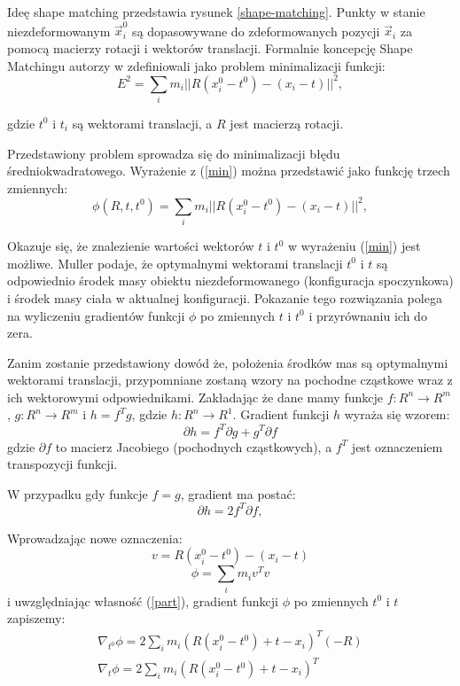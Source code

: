 Ideę shape matching przedstawia rysunek \ref{shape-matching}. Punkty w stanie
niezdeformowanym $\vec{x}^0_i$ są dopasowywane do zdeformowanych pozycji
$\vec{x}_i$ za
pomocą macierzy rotacji i wektorów translacji. 
Formalnie koncepcję Shape Matchingu autorzy w \cite{shape} zdefiniowali jako problem minimalizacji
funkcji:
\begin{equation}
E^2 = \sum_{i} m_i ||R (x^0_i - t^0) - (x_i - t) ||^2,
\label{min}
\end{equation}

gdzie $t^0$ i $t_i$ są wektorami translacji, a $R$ jest macierzą
rotacji.

Przedstawiony problem sprowadza się do minimalizacji błędu średniokwadratowego.
Wyrażenie z (\ref{min}) można przedstawić jako funkcję trzech zmiennych:
\begin{equation*}
\phi(R, t, t^0) = \sum_{i} m_i ||R (x^0_i - t^0) - (x_i - t) ||^2,
\end{equation*}

Okazuje się, że znalezienie wartości wektorów $t$ i $t^0$ w
wyrażeniu (\ref{min}) jest możliwe. Muller \cite{shape} podaje, że optymalnymi
wektorami translacji $t^0$ i $t$ są odpowiednio środek masy obiektu
niezdeformowanego (konfiguracja spoczynkowa) i środek masy
ciała w aktualnej konfiguracji. Pokazanie tego rozwiązania polega na
wyliczeniu gradientów funkcji $\phi$ po zmiennych $t$ i $t^0$ i przyrównaniu ich
do zera.

Zanim zostanie przedstawiony dowód że, położenia środków mas są optymalnymi wektorami
translacji, przypomniane zostaną wzory na pochodne cząstkowe wraz z ich
wektorowymi odpowiednikami. Zakładając że dane mamy funkcje $f: R^n \to R^m$,
$g: R^n \to R^m$ i $h = f^T g$, gdzie $h: R^n \to R^1$. Gradient
funkcji $h$ wyraża się wzorem:
\begin{equation*}
\partial h = f^T \partial g + g^T \partial f
\end{equation*}
gdzie $\partial f$ to macierz Jacobiego (pochodnych cząstkowych), a $f^T$ jest
oznaczeniem transpozycji funkcji.

W przypadku gdy funkcje $f = g$, gradient ma postać:
\begin{equation}
\partial h = 2 f^T \partial f,
\label{part}
\end{equation}

Wprowadzając nowe oznaczenia:
$$ v = R (x^0_i - t^0) - (x_i - t)$$
$$ \phi = \sum_i m_i v^T v$$ 
i uwzględniając własność (\ref{part}), gradient funkcji $\phi$ po
zmiennych $t^0$ i $t$ zapiszemy:
\begin{eqnarray*}
\nabla_{t^0} \phi = 2 \sum_i m_i (R (x^0_i - t^0) + t - x_i)^T (-R)\\
\nabla_{t} \phi = 2 \sum_i m_i (R (x^0_i - t^0) + t - x_i)^T\\
\end{eqnarray*}

